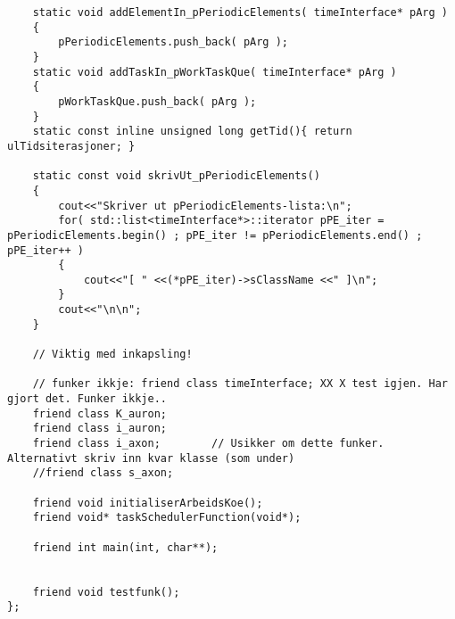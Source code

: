 \begin{lstlisting}
	static void addElementIn_pPeriodicElements( timeInterface* pArg )
	{
		pPeriodicElements.push_back( pArg );
	}
	static void addTaskIn_pWorkTaskQue( timeInterface* pArg )
	{
	 	pWorkTaskQue.push_back( pArg );
	}
	static const inline unsigned long getTid(){ return ulTidsiterasjoner; }
	
	static const void skrivUt_pPeriodicElements()
	{
		cout<<"Skriver ut pPeriodicElements-lista:\n";
		for( std::list<timeInterface*>::iterator pPE_iter = pPeriodicElements.begin() ; pPE_iter != pPeriodicElements.end() ; pPE_iter++ )
		{
			cout<<"[ " <<(*pPE_iter)->sClassName <<" ]\n";
		}
		cout<<"\n\n";
	}

	// Viktig med inkapsling!

	// funker ikkje: friend class timeInterface; XX X test igjen. Har gjort det. Funker ikkje..
	friend class K_auron;
	friend class i_auron;
	friend class i_axon; 		// Usikker om dette funker. Alternativt skriv inn kvar klasse (som under)
	//friend class s_axon;

	friend void initialiserArbeidsKoe();
	friend void* taskSchedulerFunction(void*);
	
	friend int main(int, char**);


	friend void testfunk();
};

\end{lstlisting}














